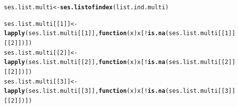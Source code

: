 \documentclass[12pt]{article}\usepackage[]{graphicx}\usepackage[]{color}
\makeatletter
\newcommand{\hlnum}[1]{\textcolor[rgb]{0.686,0.059,0.569}{#1}}%
\newcommand{\hlopt}[1]{\textcolor[rgb]{0,0,0}{#1}}%
\newcommand{\hlstd}[1]{\textcolor[rgb]{0.345,0.345,0.345}{#1}}%
\newcommand{\hlkwa}[1]{\textcolor[rgb]{0.161,0.373,0.58}{\textbf{#1}}}%
\newcommand{\hlkwb}[1]{\textcolor[rgb]{0.69,0.353,0.396}{#1}}%
\newcommand{\hlkwc}[1]{\textcolor[rgb]{0.333,0.667,0.333}{#1}}%
\newcommand{\hlkwd}[1]{\textcolor[rgb]{0.737,0.353,0.396}{\textbf{#1}}}%
\newenvironment{kframe}{%
 \def\at@end@of@kframe{}%
 \ifinner\ifhmode%
  \def\at@end@of@kframe{\end{minipage}}%
  \begin{minipage}{\columnwidth}%
 \fi\fi%
 \def\FrameCommand##1{\hskip\@totalleftmargin \hskip-\fboxsep
 \colorbox{shadecolor}{##1}\hskip-\fboxsep
     \hskip-\linewidth \hskip-\@totalleftmargin \hskip\columnwidth}%
 \MakeFramed {\advance\hsize-\width
   \@totalleftmargin\z@ \linewidth\hsize
   \@setminipage}}%
 {\par\unskip\endMakeFramed%
 \at@end@of@kframe}
\newenvironment{knitrout}{}{} %
\makeatother
\begin{document}
 
\begin{knitrout}
\color{fgcolor}\begin{kframe}
\begin{alltt}
\hlstd{ses.list.multi} \hlkwb{<-} \hlkwd{ses.listofindex}\hlstd{(list.ind.multi)}

\hlstd{ses.list.multi[[}\hlnum{1}\hlstd{]]} \hlkwb{<-} \hlkwd{lapply}\hlstd{(ses.list.multi[[}\hlnum{1}\hlstd{]],} \hlkwa{function}\hlstd{(}\hlkwc{x}\hlstd{) x[}\hlopt{!}\hlkwd{is.na}\hlstd{(ses.list.multi[[}\hlnum{1}\hlstd{]][[}\hlnum{2}\hlstd{]])])}
\hlstd{ses.list.multi[[}\hlnum{2}\hlstd{]]} \hlkwb{<-} \hlkwd{lapply}\hlstd{(ses.list.multi[[}\hlnum{2}\hlstd{]],} \hlkwa{function}\hlstd{(}\hlkwc{x}\hlstd{) x[}\hlopt{!}\hlkwd{is.na}\hlstd{(ses.list.multi[[}\hlnum{2}\hlstd{]][[}\hlnum{2}\hlstd{]])])}
\hlstd{ses.list.multi[[}\hlnum{3}\hlstd{]]} \hlkwb{<-} \hlkwd{lapply}\hlstd{(ses.list.multi[[}\hlnum{3}\hlstd{]],} \hlkwa{function}\hlstd{(}\hlkwc{x}\hlstd{) x[}\hlopt{!}\hlkwd{is.na}\hlstd{(ses.list.multi[[}\hlnum{3}\hlstd{]][[}\hlnum{2}\hlstd{]])])}


\end{alltt}
\end{kframe}
\end{knitrout}
\end{document}
